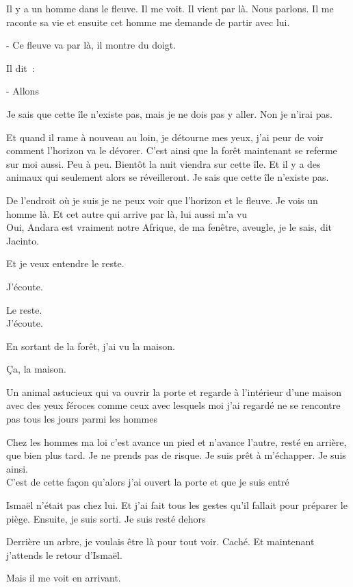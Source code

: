Il y a un homme dans le fleuve. Il me voit. Il vient par là. Nous
parlons. Il me raconte sa vie et ensuite cet homme me demande de partir
avec lui.

- Ce fleuve va par là, il montre du doigt.

Il dit~:

- Allons

Je sais que cette île n'existe pas, mais je ne dois pas y aller. Non je
n'irai pas.

Et quand il rame à nouveau au loin, je détourne mes yeux, j'ai peur de
voir comment l'horizon va le dévorer. C'est ainsi que la forêt
maintenant se referme sur moi aussi. Peu à peu. Bientôt la nuit viendra
sur cette île. Et il y a des animaux qui seulement alors se
réveilleront. Je sais que cette île n'existe pas.

De l'endroit où je suis je ne peux voir que l'horizon et le fleuve. Je
vois un homme là. Et cet autre qui arrive par là, lui aussi m'a vu\\

Oui, Andara est vraiment notre Afrique, de ma fenêtre, aveugle, je le
sais, dit Jacinto.

Et je veux entendre le reste.

J'écoute.

Le reste.\\

J'écoute.

En sortant de la forêt, j'ai vu la maison.

Ça, la maison.

Un animal astucieux qui va ouvrir la porte et regarde à l'intérieur
d'une maison avec des yeux féroces comme ceux avec lesquels moi j'ai
regardé ne se rencontre pas tous les jours parmi les hommes

Chez les hommes ma loi c'est avance un pied et n'avance l'autre, resté
en arrière, que bien plus tard. Je ne prends pas de risque. Je suis prêt
à m'échapper. Je suis ainsi.\\

C'est de cette façon qu'alors j'ai ouvert la porte et que je suis entré

Ismaël n'était pas chez lui. Et j'ai fait tous les gestes qu'il fallait
pour préparer le piège. Ensuite, je suis sorti. Je suis resté dehors

Derrière un arbre, je voulais être là pour tout voir. Caché. Et
maintenant j'attends le retour d'Ismaël.

Mais il me voit en arrivant.

